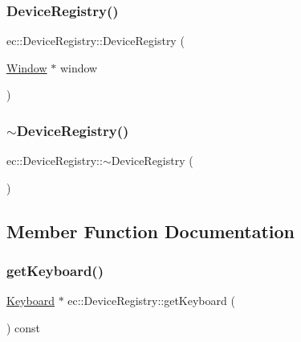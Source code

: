 \subsubsection{\texorpdfstring{Device\+Registry()}{DeviceRegistry()}}
{\footnotesize\ttfamily ec\+::\+Device\+Registry\+::\+Device\+Registry (\begin{DoxyParamCaption}\item[{\mbox{\hyperlink{classec_1_1_window}{Window}} $\ast$}]{window }\end{DoxyParamCaption})\hspace{0.3cm}{\ttfamily [explicit]}}

\mbox{\label{classec_1_1_device_registry_a75dff0df1527fe9d7e75b25f3dff4028}} 
\subsubsection{\texorpdfstring{$\sim$\+Device\+Registry()}{~DeviceRegistry()}}
{\footnotesize\ttfamily ec\+::\+Device\+Registry\+::$\sim$\+Device\+Registry (\begin{DoxyParamCaption}{ }\end{DoxyParamCaption})\hspace{0.3cm}{\ttfamily [default]}}



\subsection{Member Function Documentation}
\mbox{\label{classec_1_1_device_registry_aabbeda3bb4977e230b974c92b6048027}} 
\subsubsection{\texorpdfstring{get\+Keyboard()}{getKeyboard()}}
{\footnotesize\ttfamily \mbox{\hyperlink{classec_1_1_keyboard}{Keyboard}} $\ast$ ec\+::\+Device\+Registry\+::get\+Keyboard (\begin{DoxyParamCaption}{ }\end{DoxyParamCaption}) const}

